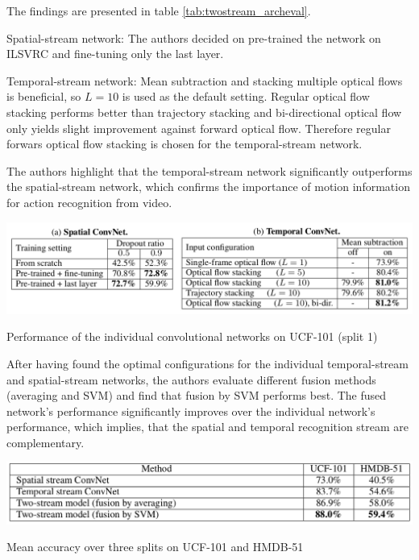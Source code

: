 The findings are presented in table \ref{tab:twostream_archeval}.

Spatial-stream network: The authors decided on pre-trained the network on ILSVRC and fine-tuning only the last layer.

Temporal-stream network: Mean subtraction and stacking multiple optical flows is beneficial, so $L=10$ is used as the default setting. Regular optical flow stacking performs better than trajectory stacking and bi-directional optical flow only yields slight improvement against forward optical flow. Therefore regular forwars optical flow stacking is chosen for the temporal-stream network.

The authors highlight that the temporal-stream network significantly outperforms the spatial-stream network, which confirms the importance of motion information for action recognition from video.

\begin{table}[H]
    \centering
    \includegraphics[width=\textwidth]{img_deep/twostream_archeval}
    \caption{Performance of the individual convolutional networks on UCF-101 (split 1) \cite{simonyan_two-stream_2014}}
    \label{tab:twostream_archeval}
\end{table}

After having found the optimal configurations for the individual temporal-stream and spatial-stream networks, the authors evaluate different fusion methods (averaging and SVM) and find that fusion by SVM performs best. The fused network's performance significantly improves over the individual network's performance, which implies, that the spatial and temporal recognition stream are complementary.

\begin{table}
    \centering
    \includegraphics[width=\textwidth]{img_deep/twostream_results}
    \caption{Mean accuracy over three splits on UCF-101 and HMDB-51 \cite{simonyan_two-stream_2014}}
    \label{tab:twostream_results}
\end{table}

